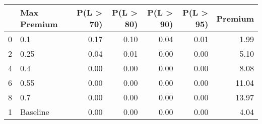 \begin{tabular}{llrrrrr}
\toprule
{} & Max Premium &  P(L > 70) &  P(L > 80) &  P(L > 90) &  P(L > 95) &  Premium \\
\midrule
0 &         0.1 &       0.17 &       0.10 &       0.04 &       0.01 &     1.99 \\
2 &        0.25 &       0.04 &       0.01 &       0.00 &       0.00 &     5.10 \\
4 &         0.4 &       0.00 &       0.00 &       0.00 &       0.00 &     8.08 \\
6 &        0.55 &       0.00 &       0.00 &       0.00 &       0.00 &    11.04 \\
8 &         0.7 &       0.00 &       0.00 &       0.00 &       0.00 &    13.97 \\
1 &    Baseline &       0.00 &       0.00 &       0.00 &       0.00 &     4.04 \\
\bottomrule
\end{tabular}
